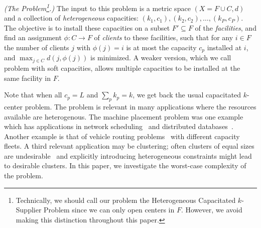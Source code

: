 \begin{definition}\emph{(The \mckc Problem\footnote{Technically, we should call our problem the Heterogeneous Capacitated $k$-Supplier Problem since we can only open centers in $F$. However, we avoid making this distinction throughout this paper.}.)}
	The input to this problem is a metric space $(X = F\cup C,d)$  %
	and  a collection of {\em heterogeneous} capacities: $(k_1,c_1), (k_2,c_2),\ldots, (k_P,c_P)$.
	The objective is to install these capacities on a subset $F'\subseteq F$ of the {\em facilities}, and find an assignment $\phi:C\to F$ of {\em clients} to these facilities, 
	such that for any $i\in F$ the number of clients $j$ with $\phi(j) = i$ is at most the capacity $c_p$ installed at $i$, and $\max_{j\in C} d(j,\phi(j))$ is minimized.
	A weaker version, which we call \mckc problem with soft capacities, allows multiple capacities to be installed at the same facility in $F$.
\end{definition}
\noindent
Note that when all $c_p = L$ and $\sum_p k_p = k$, we get back the usual capacitated $k$-center problem.
The \mckc problem is relevant in many applications where the resources available are heterogenous. The machine placement problem was one example which has applications in network scheduling~\cite{stein paper, im-moseley paper} and distributed databases~\cite{morgan-levin,SKRN15}. Another example is that of  vehicle routing problems~\cite{find citation-- i forgot} with different capacity fleets. A third relevant application may be clustering; often clusters of equal sizes are undesirable~\cite{see cites in our icalp paper} and explicitly introducing heterogeneous constraints might lead to desirable clusters.
In this paper, we investigate the worst-case complexity of the \mckc problem. %


